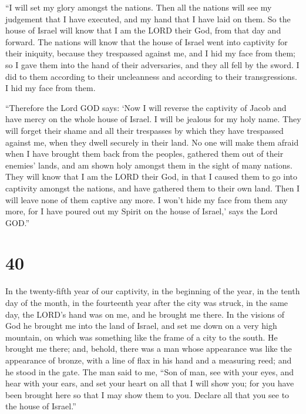  ``I will set my glory amongst the nations. Then all the
nations will see my judgement that I have executed, and my hand that I
have laid on them.  So the house of Israel will know that
I am the LORD their God, from that day and forward.  The
nations will know that the house of Israel went into captivity for their
iniquity, because they trespassed against me, and I hid my face from
them; so I gave them into the hand of their adversaries, and they all
fell by the sword.  I did to them according to their
uncleanness and according to their transgressions. I hid my face from
them.

 ``Therefore the Lord GOD says: `Now I will reverse the
captivity of Jacob and have mercy on the whole house of Israel. I will
be jealous for my holy name.  They will forget their
shame and all their trespasses by which they have trespassed against me,
when they dwell securely in their land. No one will make them afraid
 when I have brought them back from the peoples, gathered
them out of their enemies' lands, and am shown holy amongst them in the
sight of many nations.  They will know that I am the LORD
their God, in that I caused them to go into captivity amongst the
nations, and have gathered them to their own land. Then I will leave
none of them captive any more.  I won't hide my face from
them any more, for I have poured out my Spirit on the house of Israel,'
says the Lord GOD.''

\hypertarget{section-38}{%
\section{40}\label{section-38}}

 In the twenty-fifth year of our captivity, in the
beginning of the year, in the tenth day of the month, in the fourteenth
year after the city was struck, in the same day, the LORD's hand was on
me, and he brought me there.  In the visions of God he
brought me into the land of Israel, and set me down on a very high
mountain, on which was something like the frame of a city to the south.
 He brought me there; and, behold, there was a man whose
appearance was like the appearance of bronze, with a line of flax in his
hand and a measuring reed; and he stood in the gate.  The
man said to me, ``Son of man, see with your eyes, and hear with your
ears, and set your heart on all that I will show you; for you have been
brought here so that I may show them to you. Declare all that you see to
the house of Israel.''

